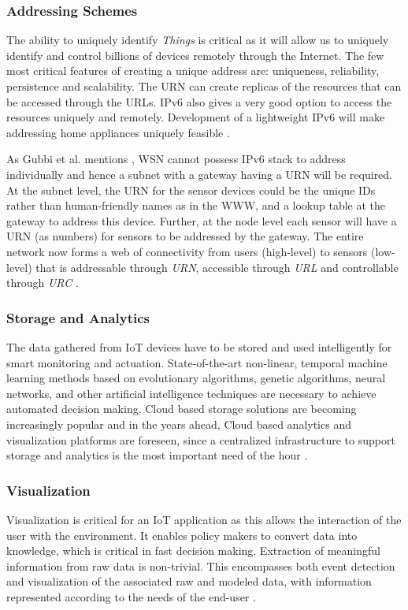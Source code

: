 \subsubsection{Addressing Schemes}
The ability to uniquely identify \textit{Things} is critical as it will allow us to uniquely identify and control billions of devices remotely through the Internet. The few most critical features of creating a unique address are: uniqueness, reliability, persistence and scalability. The \acs{URN} can create replicas of the resources that can be accessed through the \acs{URL}s. \acs{IPv6} also gives a very good option to access the resources uniquely and remotely. Development of a lightweight \acs{IPv6} will make addressing home appliances uniquely feasible \cite{IOTGUBBI}. 

As Gubbi et al. mentions \cite{IOTGUBBI}, \acs{WSN} cannot possess \acs{IPv6} stack to address individually and hence a subnet with a gateway having a \acs{URN} will be required. At the subnet level, the \acs{URN} for the sensor devices could be the unique IDs rather than human-friendly names as in the \acs{WWW}, and a lookup table at the gateway to address this device. Further, at the node level each sensor will have a \acs{URN} (as numbers) for sensors to be addressed by the gateway. The entire network now forms a web of connectivity from users (high-level) to sensors (low-level) that is addressable through \textit{\acs{URN}}, accessible through \textit{\acs{URL}} and controllable through \textit{\acs{URC}} \cite{IOTGUBBI}.

\subsubsection{Storage and Analytics}
The data gathered from \acs{IoT} devices have to be stored and used intelligently for smart monitoring and actuation. State-of-the-art non-linear, temporal machine learning methods based on evolutionary algorithms, genetic algorithms, neural networks, and other artificial intelligence techniques are necessary to achieve automated decision making. Cloud based storage solutions are becoming increasingly popular and in the years ahead, Cloud based analytics and visualization platforms are foreseen, since a centralized infrastructure to support storage and analytics is the most important need of the hour \cite{IOTGUBBI}.

\subsubsection{Visualization}
Visualization is critical for an \acs{IoT} application as this allows the interaction of the user with the environment. It enables policy makers to convert data into knowledge, which is critical in fast decision making. Extraction of meaningful information from raw data is non-trivial. This encompasses both event detection and visualization of the associated raw and modeled data, with information represented according to the needs of the end-user \cite{IOTGUBBI}.

